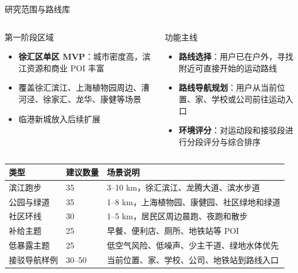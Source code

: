 \documentclass[xcolor=table,dvipsnames,svgnames,aspectratio=169]{ctexbeamer}
\newcommand{\kw}[1]{\textbf{\color{cprimary}#1}}
\newcommand{\smallitem}{\setlength{\itemsep}{0.25em}}
\begin{document}
\begin{frame}{研究范围与路线库}
  \scriptsize
  \begin{columns}[T]
    \begin{block}{第一阶段区域}
      \begin{itemize}
        \smallitem
        \item \kw{徐汇区单区 MVP}：城市密度高，滨江资源和商业 POI 丰富
        \item 覆盖徐汇滨江、上海植物园周边、漕河泾、徐家汇、龙华、康健等场景
        \item 临港新城放入后续扩展
      \end{itemize}
    \end{block}

    \begin{block}{功能主线}
      \begin{itemize}
        \smallitem
        \item \kw{路线选择}：用户已在户外，寻找附近可直接开始的运动路线
        \item \kw{路线导航规划}：用户从当前位置、家、学校或公司前往运动入口
        \item \kw{环境评分}：对运动段和接驳段进行分段评分与综合排序
      \end{itemize}
    \end{block}
  \end{columns}

  \vspace{0.15em}
  \begin{tabularx}{\textwidth}{p{}p{}Y}
    \toprule
    类型 & 建议数量 & 场景说明 \\
    \midrule
    滨江跑步 & 35 & 3--10 km，徐汇滨江、龙腾大道、滨水步道 \\
    公园与绿道 & 35 & 1--8 km，上海植物园、康健园、社区绿地和绿道 \\
    社区环线 & 30 & 1--5 km，居民区周边晨跑、夜跑和散步 \\
    补给主题 & 25 & 早餐、便利店、厕所、地铁站等 POI \\
    低暴露主题 & 25 & 低空气风险、低噪声、少主干道、绿地水体优先 \\
    接驳导航样例 & 30--50 & 当前位置、家、学校、公司、地铁站到路线入口 \\
    \bottomrule
  \end{tabularx}
\end{frame}
\end{document}
